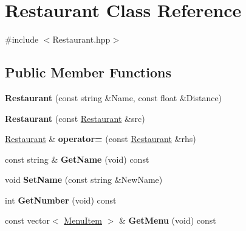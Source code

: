 \hypertarget{classRestaurant}{\section{Restaurant Class Reference}
\label{classRestaurant}
}


{\ttfamily \#include $<$Restaurant.\-hpp$>$}

\subsection*{Public Member Functions}
\begin{DoxyCompactItemize}
\item 
\hypertarget{classRestaurant_a9ec8ac32f27c5e0b28376e5393bf1a46}{{\bfseries Restaurant} (const string \&Name, const float \&Distance)}\label{classRestaurant_a9ec8ac32f27c5e0b28376e5393bf1a46}

\item 
\hypertarget{classRestaurant_a509c9b7425703b48195ed2926a4e59e2}{{\bfseries Restaurant} (const \hyperlink{classRestaurant}{Restaurant} \&src)}\label{classRestaurant_a509c9b7425703b48195ed2926a4e59e2}

\item 
\hypertarget{classRestaurant_ac1f6dd1cc1e467a47134bd46330a0020}{\hyperlink{classRestaurant}{Restaurant} \& {\bfseries operator=} (const \hyperlink{classRestaurant}{Restaurant} \&rhs)}\label{classRestaurant_ac1f6dd1cc1e467a47134bd46330a0020}

\item 
\hypertarget{classRestaurant_a83808709ef46511be0ee73018b9e6d66}{const string \& {\bfseries Get\-Name} (void) const }\label{classRestaurant_a83808709ef46511be0ee73018b9e6d66}

\item 
\hypertarget{classRestaurant_a6035d861ae0ef8a8951002d6865b0362}{void {\bfseries Set\-Name} (const string \&New\-Name)}\label{classRestaurant_a6035d861ae0ef8a8951002d6865b0362}

\item 
\hypertarget{classRestaurant_aba8d743b610738dde66dd14d623b2dde}{int {\bfseries Get\-Number} (void) const }\label{classRestaurant_aba8d743b610738dde66dd14d623b2dde}

\item 
\hypertarget{classRestaurant_a918f12ce388683a75e6934b05f524a21}{const vector$<$ \hyperlink{classMenuItem}{Menu\-Item} $>$ \& {\bfseries Get\-Menu} (void) const }\label{classRestaurant_a918f12ce388683a75e6934b05f524a21}


\end{DoxyCompactItemize}
